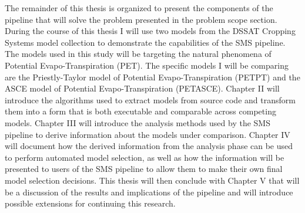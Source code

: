 The remainder of this thesis is organized to present the components of the pipeline that will solve the problem presented in the problem scope section. During the course of this thesis I will use two models from the DSSAT Cropping Systems model collection to demonstrate the capabilities of the SMS pipeline. The models used in this study will be targeting the natural phenomena of Potential Evapo-Transpiration (PET). The specific models I will be comparing are the Priestly-Taylor model of Potential Evapo-Transpiration (PETPT) and the ASCE model of Potential Evapo-Transpiration (PETASCE). Chapter II will introduce the algorithms used to extract models from source code and transform them into a form that is both executable and comparable across competing models. Chapter III will introduce the analysis methods used by the SMS pipeline to derive information about the models under comparison. Chapter IV will document how the derived information from the analysis phase can be used to perform automated model selection, as well as how the information will be presented to users of the SMS pipeline to allow them to make their own final model selection decisions. This thesis will then conclude with Chapter V that will be a discussion of the results and implications of the pipeline and will introduce possible extensions for continuing this research.
